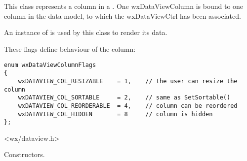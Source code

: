 
\section{}\label{wxdataviewcolumn}


This class represents a column in a .
One wxDataViewColumn is bound to one column in the data model,
to which the wxDataViewCtrl has been associated. 

An instance of  is used by
this class to render its data.


These flags define behaviour of the column:

{\small
\begin{verbatim}
enum wxDataViewColumnFlags
{
    wxDATAVIEW_COL_RESIZABLE    = 1,    // the user can resize the column
    wxDATAVIEW_COL_SORTABLE     = 2,    // same as SetSortable()
    wxDATAVIEW_COL_REORDERABLE  = 4,    // column can be reordered
    wxDATAVIEW_COL_HIDDEN       = 8     // column is hidden
};
\end{verbatim}
}




<wx/dataview.h>





\label{wxdataviewcolumnwxdataviewcolumn}



Constructors.


\label{wxdataviewcolumndtor}


